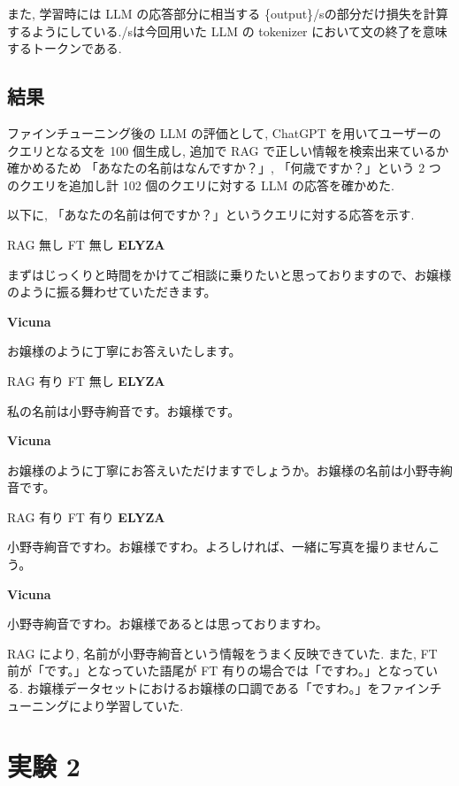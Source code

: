 \documentclass[twocolumn]{jarticle}
\begin{document}
また, 学習時には LLM の応答部分に相当する \{output\}\langle \rm{/s}\rangle の部分だけ損失を計算するようにしている.\langle \rm{/s}\rangle は今回用いた LLM の tokenizer において文の終了を意味するトークンである.

\subsection{結果}
ファインチューニング後の LLM の評価として, ChatGPT を用いてユーザーのクエリとなる文を 100 個生成し, 追加で RAG で正しい情報を検索出来ているか確かめるため 「あなたの名前はなんですか？」, 「何歳ですか？」という 2 つのクエリを追加し計 102 個のクエリに対する LLM の応答を確かめた. \par
以下に, 「あなたの名前は何ですか？」というクエリに対する応答を示す.

\begin{itembox}[l]{RAG 無し FT 無し}
\small
\textbf{ELYZA}\par
まずはじっくりと時間をかけてご相談に乗りたいと思っておりますので、お嬢様のように振る舞わせていただきます。\par
\textbf{Vicuna}\par
お嬢様のように丁寧にお答えいたします。\par
\end{itembox}
\begin{itembox}[l]{RAG 有り FT 無し}
\small
\textbf{ELYZA}\par
私の名前は小野寺絢音です。お嬢様です。\par
\textbf{Vicuna}\par
お嬢様のように丁寧にお答えいただけますでしょうか。お嬢様の名前は小野寺絢音です。\par
\end{itembox}
\begin{itembox}[l]{RAG 有り FT 有り}
\small
\textbf{ELYZA}\par
小野寺絢音ですわ。お嬢様ですわ。よろしければ、一緒に写真を撮りませんこう。              \par
\textbf{Vicuna}\par
小野寺絢音ですわ。お嬢様であるとは思っておりますわ。\par
\end{itembox}
RAG により, 名前が小野寺絢音という情報をうまく反映できていた. また, FT 前が「です。」となっていた語尾が FT 有りの場合では「ですわ。」となっている. お嬢様データセットにおけるお嬢様の口調である「ですわ。」をファインチューニングにより学習していた. 

\section{実験 2}
\end{document}
